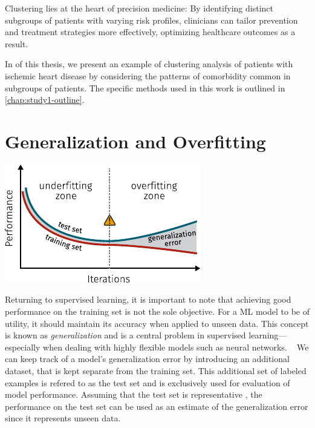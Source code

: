 Clustering lies at the heart of precision medicine:
By identifying distinct subgroups of patients with varying risk profiles, 
clinicians can tailor prevention and treatment strategies more effectively, 
optimizing healthcare outcomes as a result.

In \studyi{} of this thesis,
we present an example of clustering analysis of patients with 
ischemic heart disease by considering the patterns of comorbidity 
common in subgroups of patients.
The specific methods used in this work is outlined 
in \cref{chap:study1-outline}.

\section{Generalization and Overfitting}
\label{overfitting}

\begin{marginfigure}[3em]
    \centering
	\includegraphics{graphics/overfitting-2}
    \caption[Overfitting as Function of Number of Epochs]{%
        Training a neural network model for many iterations 
        runs the risk of overfitting the model to the training data.
        Although the training error keeps decreasing, 
        it happens at the expense of increased generalization error.
        Inspired by \cite{goodfellow2016deep}.
    }
    \label{fig:generalization-error}
\end{marginfigure}

Returning to supervised learning,
it is important to note that achieving good performance on the 
training set is not the sole objective.
For a \ac{ML} model to be of utility, 
it should maintain its accuracy
when applied to unseen data.
This concept is known as \textit{generalization} and
is a central problem in supervised learning---%
especially when dealing with highly flexible models 
such as neural networks.
~\autocite{goodfellow2016deep}
We can keep track of a model's generalization error 
by introducing an additional dataset, 
that is kept separate from the training set. 
This additional set of labeled examples is refered to as the test set
and is exclusively used for evaluation of model performance.
Assuming that the test set is representative%
\sidenote{%
    An underlying assumption is that the two datasets are 
    independent and identically distributed 
    (typically abbreviated as i.i.d.),
    and thus share the same underlying \textit{data-generating process}.
    [\cite{goodfellow2016deep}]
},
the performance on the test set can be used as an estimate of 
the generalization error since it represents unseen data.


